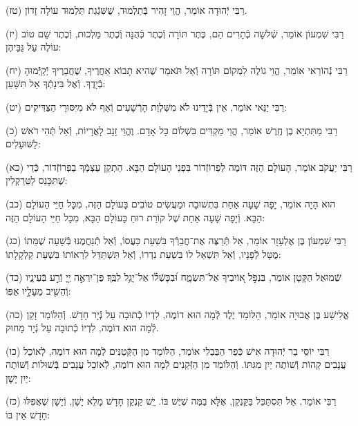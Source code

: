 \documentclass[twoside, openany, parskip=half, 11pt]{book}
\begin{document}
(טז)
רַבִּי יְֿהוּדָה אוֹמֵר, הֱוֵי זָהִיר בְּֿתַלְמוּד, שֶׁשִּׁגְֿגַת תַּלְמוּד עוֹלָה זָדוֹן.

(יז)
רַבִּי שִׁמְעוֹן אוֹמֵר, שְֿׁלשָׁה כְֿתָרִים הֵם,
כֶּתֶר תּוֹרָה
וְֿכֶתֶר כְּֿהֻנָּה
וְֿכֶתֶר מַלְכוּת,
וְֿכֶתֶר שֵׁם טוֹב עוֹלֶה עַל גַּבֵּיהֶן:



(יח)
רַבִּי נְֿהוֹרַאי אוֹמֵר, הֱוֵי גוֹלֶה לִמְקוֹם תּוֹרָה וְֿאַל תֹּאמַר שֶׁהִיא תָבוֹא אַחֲרֶיךָ, שֶׁחֲבֵרֶיךָ יְֿקַיְּֿֿמוּהָ בְֿיָדֶךָ.
וְֿאֶל בִּינָתְֿךָ אַל תִּשָּׁעֵן:

(יט)
רַבִּי יַנַּאי אוֹמֵר, אֵין בְּֿיָדֵינוּ לֹא מִשַּׁלְוַת הָרְֿשָׁעִים וְֿאַף לֹא מִיִּסּוּרֵי הַצַּדִּיקִים:

(כ)
רַבִּי מַתִּתְיָא בֶן חֶֽרֶשׁ אוֹמֵר, הֱוֵי מַקְדִּים בִּשְׁלוֹם כָּל אָדָם.
וֶהֱוֵי זָנָב לָאֲרָיוֹת, וְֿאַל תְּֿהִי רֹאשׁ לַשּׁוּעָלִים:

(כא)
רַבִּי יַעֲקֹב אוֹמֵר, הָעוֹלָם הַזֶּה דּוֹמֶה לַפְרוֹזְֿדוֹר בִּפְנֵי הָעוֹלָם הַבָּא.
הַתְקֵן עַצְמְֿךָ בַפְרוֹזְֿדוֹר, כְּֿדֵי שֶׁתִּכָּנֵס לַטְּרַקְלִין:

(כב)
הוּא הָיָה אוֹמֵר, יָפָה שָׁעָה אַחַת בִּתְשׁוּבָה וּמַעֲשִׂים טוֹבִים בָּעוֹלָם הַזֶּה, מִכָּל חַיֵּי הַעוֹלָם הַבָּא.
וְֿיָפָה שָׁעָה אַחַת שֶׁל קוֹרַת רוּחַ בָּעוֹלָם הַבָּא, מִכָּל חַיֵּי הָעוֹלָם הַזֶּה:

(כג)
רַבִּי שִׁמְעוֹן בֶּן אֶלְעָזָר אוֹמֵר, אַל תְּֿרַצֶּה אֶת־חֲבֵרְֿךָ בִּשְׁעַת כַּעֲסוֹ,
וְֿאַל תְֿנַחֲמֶנּוּ בְּֿשָׁעָה שֶׁמֵּתוֹ מֻטָּל לְֿפָנָיו,
וְֿאַל תִּשְׁאַל לוֹ בִּשְׁעַת נִדְרוֹ,
וְֿאַל תִּשְׁתַּדֵּל לִרְאוֹתוֹ בִּשְׁעַת קַלְקָלָתוֹ:

(כד)
שְֿׁמוּאֵל הַקָּטָן אוֹמֵר, בִּנְפֹ֣ל א֭וֹיִבְיךָ אַל־תִּשְׂמָ֑ח וּ֝בִכָּשְֿׁל֗וֹ אַל־יָגֵ֥ל לִבֶּֽךָ׃ פֶּן־יִרְאֶ֣ה יְ֖יָ וְֿרַ֣ע בְּֿעֵינָ֑יו וְֿהֵשִׁ֖יב מֵעָלָ֣יו אַפּֽוֹ:

(כה)
אֱלִישָׁע בֶּן אֲבוּיָה אוֹמֵר, הַלּוֹמֵד יֶלֶד לְֿמָה הוּא דוֹמֶה, לִדְיוֹ כְֿתוּבָה עַל נְֿיָר חָדָשׁ.
וְֿהַלּוֹמֵד זָקֵן לְֿמָה הוּא דוֹמֶה, לִדְיוֹ כְֿתוּבָה עַל נְֿיָר מָחוּק.

(כו)
רַבִּי יוֹסֵי בַר יְֿהוּדָה אִישׁ כְּֿפַר הַבַּבְלִי אוֹמֵר, הַלּוֹמֵד מִן הַקְּֿטַנִּים לְֿמָה הוּא דוֹמֶה, לְֿאוֹכֵל עֲנָבִים קֵהוֹת וְֿשׁוֹתֶה יַיִן מִגִּתּוֹ.
וְֿהַלּוֹמֵד מִן הַזְּֿקֵנִים לְֿמָה הוּא דוֹמֶה, לְֿאוֹכֵל עֲנָבִים בְּֿשׁוּלוֹת וְֿשׁוֹתֶה יַיִן יָשָׁן:

(כז)
רַבִּי אוֹמֵר, אַל תִּסְתַּכֵּל בַּקַּנְקַן, אֶלָּא בַמֶּה שֶׁיֶּשׁ בּוֹ. יִֵשׁ קַנְקַן חָדָשׁ מָלֵא יָשָׁן, וְֿיָשָׁן שֶׁאֲפִלּוּ חָדָשׁ אֵין בּוֹ:
\end{document}
